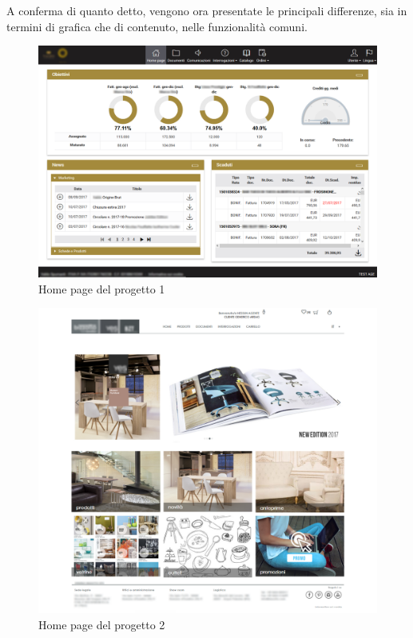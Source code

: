 A conferma di quanto detto, vengono ora presentate le principali differenze, sia in termini di grafica che di contenuto, nelle funzionalità comuni.
\begin{figure}
	\centering
	\includegraphics[width=\linewidth]{Immagini/p1/home.png}
	\caption{Home page del progetto 1}
	\label{fig:home-1}
\end{figure}
\begin{figure}
	\centering
	\includegraphics[width=\linewidth]{Immagini/p2/home.png}
	\caption{Home page del progetto 2}
	\label{fig:home-2}
\end{figure}
\newpage
